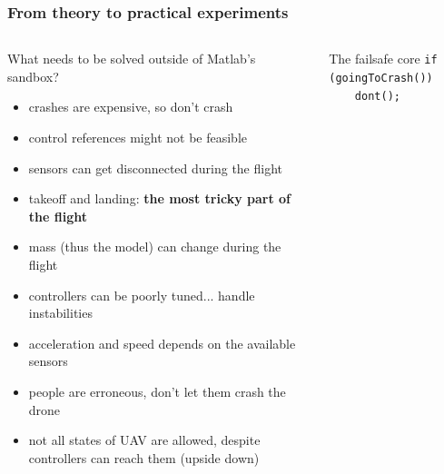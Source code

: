 \documentclass[aspectratio=1610]{beamer}
\begin{document}
\begin{frame}
\begin{columns}[c]


  \end{columns}

\end{frame}


\begin{frame}
  \frametitle{From theory to practical experiments}

  \begin{columns}[c]

    \begin{block}{What needs to be solved outside of Matlab's sandbox?}
      \begin{itemize}
        \item crashes are expensive, so don't crash
        \item control references might not be feasible
        \item sensors can get disconnected during the flight
        \item takeoff and landing: \textbf{the most tricky part of the flight}
        \item mass (thus the model) can change during the flight
        \item controllers can be poorly tuned... handle instabilities
        \item acceleration and speed depends on the available sensors
        \item people are erroneous, don't let them crash the drone
        \item not all states of UAV are allowed, despite controllers can reach them (upside down)
      \end{itemize}
    \end{block}

    \begin{block}{The failsafe core}
      \texttt{if (goingToCrash())}\\
      \texttt{~~~~dont();}
    \end{block}

  \end{columns}

\end{frame}
\end{document}

